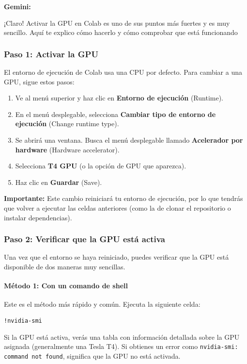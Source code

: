 \documentclass[12pt, a4paper]{article}
\newenvironment{gemini}{\par\noindent\textbf{Gemini:}\par\ignorespaces}{\par}
\begin{document}
\begin{gemini}
¡Claro! Activar la GPU en Colab es uno de sus puntos más 
fuertes y es muy sencillo. 
Aquí te explico cómo hacerlo y cómo comprobar que está 
funcionando

\subsubsection{Paso 1: Activar la GPU}
El entorno de ejecución de Colab usa una CPU por defecto. Para cambiar a una GPU, sigue 
estos pasos:
\begin{enumerate}
    \item Ve al menú superior y haz clic en \textbf{Entorno de ejecución} (Runtime).
    \item En el menú desplegable, selecciona \textbf{Cambiar tipo de entorno de ejecución} 
    (Change runtime type).
    \item Se abrirá una ventana. Busca el menú desplegable llamado 
    \textbf{Acelerador por hardware} (Hardware accelerator).
    \item Selecciona \textbf{T4 GPU} (o la opción de GPU que aparezca).
    \item Haz clic en \textbf{Guardar} (Save).
\end{enumerate}
\textbf{Importante:} Este cambio reiniciará tu entorno de ejecución, por lo que tendrás que 
volver a ejecutar las celdas anteriores (como la de clonar el repositorio o instalar 
dependencias).

\subsubsection{Paso 2: Verificar que la GPU está activa}
Una vez que el entorno se haya reiniciado, puedes verificar que la GPU está disponible de 
dos maneras muy sencillas.

\paragraph{Método 1: Con un comando de shell}
Este es el método más rápido y común. Ejecuta la siguiente celda:
\begin{lstlisting}[language=bash]
!nvidia-smi
\end{lstlisting}
Si la GPU está activa, verás una tabla con información detallada sobre la GPU asignada 
(generalmente una Tesla T4). Si obtienes un error como \texttt{nvidia-smi: command not found}, 
significa que la GPU no está activada.


\end{gemini}
\end{document}
